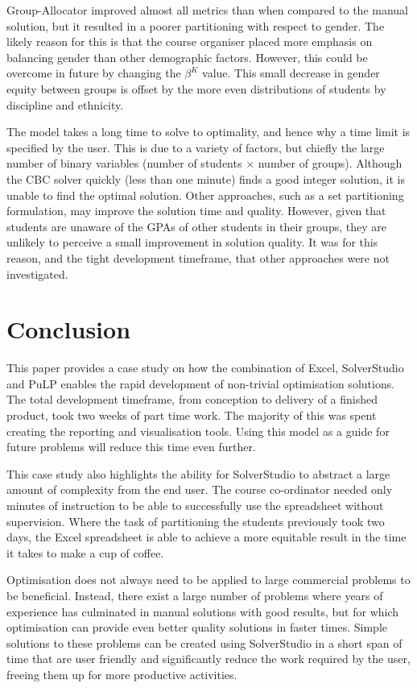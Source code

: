 \documentclass[12pt]{ORSNZ}
\begin{document}
Group-Allocator improved almost all metrics than when compared to the manual solution, but it resulted in a poorer partitioning with respect to gender. The likely reason for this is that the course organiser placed more emphasis on balancing gender than other demographic factors. However, this could be overcome in future by changing the $\beta^K$ value. This small decrease in gender equity between groups is offset by the more even distributions of students by discipline and ethnicity.

The model takes a long time to solve to optimality, and hence why a time limit is specified by the user. This is due to a variety of factors, but chiefly the large number of binary variables (number of students $\times$ number of groups). Although the CBC solver quickly (less than one minute) finds a good integer solution, it is unable to find the optimal solution. Other approaches, such as a set partitioning formulation, may improve the solution time and quality. However, given that students are unaware of the GPAs of other students in their groups, they are unlikely to perceive a small improvement in solution quality. It was for this reason, and the tight development timeframe, that other approaches were not investigated.

\section{Conclusion}
This paper provides a case study on how the combination of Excel, SolverStudio and PuLP enables the rapid development of non-trivial optimisation solutions. The total development timeframe, from conception to delivery of a finished product, took two weeks of part time work. The majority of this was spent creating the reporting and visualisation tools. Using this model as a guide for future problems will reduce this time even further.

This case study also highlights the ability for SolverStudio to abstract a large amount of complexity from the end user. The course co-ordinator needed only minutes of instruction to be able to successfully use the spreadsheet without supervision. Where the task of partitioning the students previously took two days, the Excel spreadsheet is able to achieve a more equitable result in the time it takes to make a cup of coffee.

Optimisation does not always need to be applied to large commercial problems to be beneficial. Instead, there exist a large number of problems where years of experience has culminated in manual solutions with good results, but for which optimisation can provide even better quality solutions in faster times. Simple solutions to these problems can be created using SolverStudio in a short span of time that are user friendly and significantly reduce the work required by the user, freeing them up for more productive activities.
\end{document}
